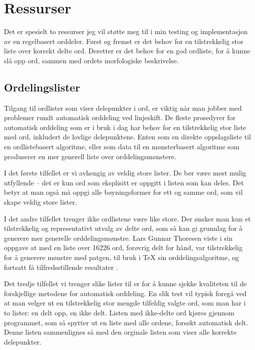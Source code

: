 \chapter{Ressurser}

Det er spesielt to ressurser jeg vil støtte meg til i min testing og implementasjon av en regelbasert orddeler. Først og fremst er det behov for en tilstrekkelig stor liste over korrekt delte ord. Deretter er det behov for en god ordliste, for å kunne slå opp ord, sammen med ordets morfologiske beskrivelse.

\section{Ordelingslister}
\label{sec:ordlister}

Tilgang til ordlister som viser delepunkter i ord, er viktig når man jobber med problemer rundt automatisk orddeling ved linjeskift. De fleste prosedyrer for automatisk orddeling som er i bruk i dag har behov for en tilstrekkelig stor liste med ord, inkludert de lovlige delepunktene. Enten som en direkte oppslagsliste til en ordlistebasert algoritme, eller som data til en mønsterbasert algoritme som produserer en mer generell liste over orddelingsmønstere. 

I det første tilfellet er vi avhengig av veldig store lister. De bør være mest mulig utfyllende -- det er kun ord som eksplisitt er oppgitt i listen som kan deles. Det betyr at man også må oppgi alle bøyningsformer for ett og samme ord, som vil skape veldig store lister. 

I det andre tilfellet trenger ikke ordlistene være like store. Der ønsker man kun et tilstrekkelig og representativt utvalg av delte ord, som så kan gi grunnlag for å generere mer generelle orddelingsmønstre. Lars Gunnar Thoresen viste i sin oppgave at med en liste over 16226 ord, forøvrig delt for hånd, var tilstrekkelig for å generere mønstre med patgen, til bruk i \TeX{} sin orddelingsalgoritme, og fortsatt få tilfredsstillende resultater \cite{thoresen1993virtuelle}.

Det tredje tilfellet vi trenger slike lister til er for å kunne sjekke kvaliteten til de forskjellige metodene for automatisk orddeling. En slik test vil typisk foregå ved at man velger ut en tilstrekkelig stor mengde tilfeldig valgte ord, som man har i to lister: en delt opp, en ikke delt. Listen med ikke-delte ord kjøres gjennom programmet, som så spytter ut en liste med alle ordene, forsøkt automatisk delt. Denne listen sammenlignes så med den orginale listen som viser alle korrekte delepunkter. 

